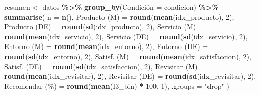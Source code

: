 \documentclass[
  spanish,
]{article}
\newenvironment{Shaded}{\begin{snugshade}}{\end{snugshade}}
\newcommand{\AttributeTok}[1]{\textcolor[rgb]{0.13,0.29,0.53}{#1}}
\newcommand{\DecValTok}[1]{\textcolor[rgb]{0.00,0.00,0.81}{#1}}
\newcommand{\FunctionTok}[1]{\textcolor[rgb]{0.13,0.29,0.53}{\textbf{#1}}}
\newcommand{\NormalTok}[1]{#1}
\newcommand{\OtherTok}[1]{\textcolor[rgb]{0.56,0.35,0.01}{#1}}
\newcommand{\SpecialCharTok}[1]{\textcolor[rgb]{0.81,0.36,0.00}{\textbf{#1}}}
\newcommand{\StringTok}[1]{\textcolor[rgb]{0.31,0.60,0.02}{#1}}
\begin{document}
\begin{Shaded}
\begin{Highlighting}[]
\NormalTok{resumen }\OtherTok{\textless{}{-}}\NormalTok{ datos }\SpecialCharTok{\%\textgreater{}\%}
  \FunctionTok{group\_by}\NormalTok{(Condición }\OtherTok{=}\NormalTok{ condicion) }\SpecialCharTok{\%\textgreater{}\%}
  \FunctionTok{summarise}\NormalTok{(}
    \AttributeTok{n    =} \FunctionTok{n}\NormalTok{(),}
    \StringTok{\textasciigrave{}}\AttributeTok{Producto (M)}\StringTok{\textasciigrave{}}   \OtherTok{=} \FunctionTok{round}\NormalTok{(}\FunctionTok{mean}\NormalTok{(idx\_producto), }\DecValTok{2}\NormalTok{),}
    \StringTok{\textasciigrave{}}\AttributeTok{Producto (DE)}\StringTok{\textasciigrave{}}  \OtherTok{=} \FunctionTok{round}\NormalTok{(}\FunctionTok{sd}\NormalTok{(idx\_producto), }\DecValTok{2}\NormalTok{),}
    \StringTok{\textasciigrave{}}\AttributeTok{Servicio (M)}\StringTok{\textasciigrave{}}   \OtherTok{=} \FunctionTok{round}\NormalTok{(}\FunctionTok{mean}\NormalTok{(idx\_servicio), }\DecValTok{2}\NormalTok{),}
    \StringTok{\textasciigrave{}}\AttributeTok{Servicio (DE)}\StringTok{\textasciigrave{}}  \OtherTok{=} \FunctionTok{round}\NormalTok{(}\FunctionTok{sd}\NormalTok{(idx\_servicio), }\DecValTok{2}\NormalTok{),}
    \StringTok{\textasciigrave{}}\AttributeTok{Entorno (M)}\StringTok{\textasciigrave{}}    \OtherTok{=} \FunctionTok{round}\NormalTok{(}\FunctionTok{mean}\NormalTok{(idx\_entorno), }\DecValTok{2}\NormalTok{),}
    \StringTok{\textasciigrave{}}\AttributeTok{Entorno (DE)}\StringTok{\textasciigrave{}}   \OtherTok{=} \FunctionTok{round}\NormalTok{(}\FunctionTok{sd}\NormalTok{(idx\_entorno), }\DecValTok{2}\NormalTok{),}
    \StringTok{\textasciigrave{}}\AttributeTok{Satisf. (M)}\StringTok{\textasciigrave{}}    \OtherTok{=} \FunctionTok{round}\NormalTok{(}\FunctionTok{mean}\NormalTok{(idx\_satisfaccion), }\DecValTok{2}\NormalTok{),}
    \StringTok{\textasciigrave{}}\AttributeTok{Satisf. (DE)}\StringTok{\textasciigrave{}}   \OtherTok{=} \FunctionTok{round}\NormalTok{(}\FunctionTok{sd}\NormalTok{(idx\_satisfaccion), }\DecValTok{2}\NormalTok{),}
    \StringTok{\textasciigrave{}}\AttributeTok{Revisitar (M)}\StringTok{\textasciigrave{}}  \OtherTok{=} \FunctionTok{round}\NormalTok{(}\FunctionTok{mean}\NormalTok{(idx\_revisitar), }\DecValTok{2}\NormalTok{),}
    \StringTok{\textasciigrave{}}\AttributeTok{Revisitar (DE)}\StringTok{\textasciigrave{}} \OtherTok{=} \FunctionTok{round}\NormalTok{(}\FunctionTok{sd}\NormalTok{(idx\_revisitar), }\DecValTok{2}\NormalTok{),}
    \StringTok{\textasciigrave{}}\AttributeTok{Recomendar (\%)}\StringTok{\textasciigrave{}} \OtherTok{=} \FunctionTok{round}\NormalTok{(}\FunctionTok{mean}\NormalTok{(I3\_bin) }\SpecialCharTok{*} \DecValTok{100}\NormalTok{, }\DecValTok{1}\NormalTok{),}
    \AttributeTok{.groups =} \StringTok{"drop"}
\NormalTok{  )}


\end{Highlighting}
\end{Shaded}
\end{document}
